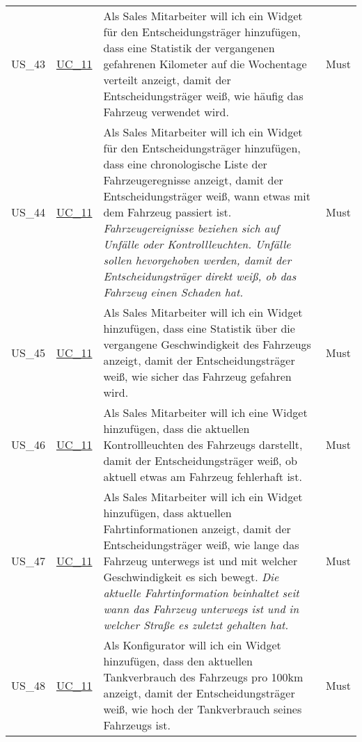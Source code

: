 \begin{footnotesize}
\begin{longtable}[L L L]{ p{} p{} p{} p{} }
      \hypertarget{Ref:US43}{US\_43} & \hyperlink{Ref:UC11}{UC\_11} & Als Sales Mitarbeiter will ich ein Widget für den Entscheidungsträger hinzufügen, dass eine Statistik der vergangenen gefahrenen Kilometer auf die Wochentage verteilt anzeigt, damit der Entscheidungsträger weiß, wie häufig das Fahrzeug verwendet wird. & Must \\
      \hypertarget{Ref:US44}{US\_44} & \hyperlink{Ref:UC11}{UC\_11} & Als Sales Mitarbeiter will ich ein Widget für den Entscheidungsträger hinzufügen, dass eine chronologische Liste der Fahrzeugeregnisse anzeigt, damit der Entscheidungsträger weiß, wann etwas mit dem Fahrzeug passiert ist. 
      \newline\newline
      \emph{Fahrzeugereignisse beziehen sich auf Unfälle oder Kontrollleuchten. Unfälle sollen hevorgehoben werden, damit der Entscheidungsträger direkt weiß, ob das Fahrzeug einen Schaden hat.} & Must
      \\
      \hypertarget{Ref:US45}{US\_45} & \hyperlink{Ref:UC11}{UC\_11} & Als Sales Mitarbeiter will ich ein Widget hinzufügen, dass eine Statistik über die vergangene Geschwindigkeit des Fahrzeugs anzeigt, damit der Entscheidungsträger weiß, wie sicher das Fahrzeug gefahren wird. & Must \\
      \hypertarget{Ref:US46}{US\_46} & \hyperlink{Ref:UC11}{UC\_11} & Als Sales Mitarbeiter will ich eine Widget hinzufügen, dass die aktuellen Kontrollleuchten des Fahrzeugs darstellt, damit der Entscheidungsträger weiß, ob aktuell etwas am Fahrzeug fehlerhaft ist. & Must \\
      \hypertarget{Ref:US47}{US\_47} & \hyperlink{Ref:UC11}{UC\_11} & Als Sales Mitarbeiter will ich ein Widget hinzufügen, dass aktuellen Fahrtinformationen anzeigt, damit der Entscheidungsträger weiß, wie lange das Fahrzeug unterwegs ist und mit welcher Geschwindigkeit es sich bewegt.
      \newline\newline
      \emph{Die aktuelle Fahrtinformation beinhaltet seit wann das Fahrzeug unterwegs ist und in welcher Straße es zuletzt gehalten hat.} & Must \\
      \hypertarget{Ref:US48}{US\_48} & \hyperlink{Ref:UC11}{UC\_11} & Als Konfigurator will ich ein Widget hinzufügen, dass den aktuellen Tankverbrauch des Fahrzeugs pro 100km anzeigt, damit der Entscheidungsträger weiß, wie hoch der Tankverbrauch seines Fahrzeugs ist. & Must \\

      \bottomrule
    \end{longtable}
  \end{footnotesize}
  \rmfamily

